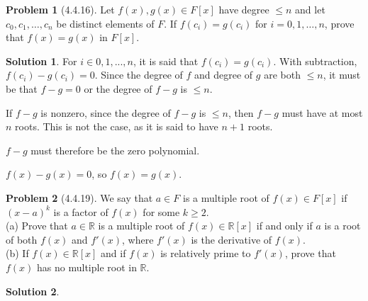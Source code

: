 \documentclass[12pt]{article}
\theoremstyle{definition}
\newtheorem*{prob}{Problem}
\newtheorem*{soln}{Solution}
\newcommand{\RR}{{\mathbb{R}}}
\begin{document}
\begin{prob}[4.4.16]
Let $f(x), g(x) \in F[x]$ have degree $\leq n$ and let 
$c_0, c_1, \dots, c_n$ be distinct elements of  $F$. If  $f(c_i) = g(c_i)$ for 
$i = 0, 1, \dots, n$, prove that $f(x) = g(x)$ in $F[x]$.
\end{prob}

\begin{soln}

For $i\in0,1,...,n$, it is said that $f(c_i)=g(c_i)$.
With subtraction, $f(c_i)-g(c_i)=0$.
Since the degree of $f$ and degree of $g$ are both $\leq n$,
it must be that $f-g=0$ or the degree of $f-g$ is $\leq n$.

If $f-g$ is nonzero,
since the degree of $f-g$ is $\leq n$,
then $f-g$ must have at most $n$ roots.
This is not the case, as it is said to have $n+1$ roots.

$f-g$ must therefore be the zero polynomial.

$f(x)-g(x)=0$, so $f(x)=g(x)$.

\end{soln}

\begin{prob}[4.4.19]
We say that $a \in F$ is a multiple root of  $f(x) \in F[x]$ if  
$(x - a)^k$ is a factor of  $f(x)$ for some $k \geq 2$. \\
(a)   Prove that $a \in \RR$ is a multiple root of  $f(x)\in \RR[x]$ 
if and only if  $a$ is a root of both $f(x)$ and $f'(x)$, where $f'(x)$ 
is the derivative of  $f(x)$.\\
(b)   If  $f(x) \in  \RR[x]$ and if $f(x)$ is relatively prime to $f'(x)$,
 prove that $f(x)$ has no multiple root in $\RR$.
\end{prob}

\begin{soln}

\end{soln}
\end{document}
